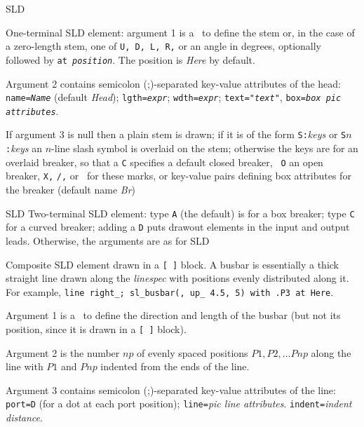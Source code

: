 %
  {SLD}%
  {One-terminal SLD element: argument 1 is a \linespec\ to define the stem
   or, in the case of a zero-length stem, one of {\tt U, D, L, R,} or an
   angle in degrees, optionally followed by {\tt at {\sl position}}.
   The position is {\sl Here} by default.

   Argument 2 contains semicolon (;)-separated key-value attributes
   of the head:
   {\tt name={\sl{}Name}} (default {\sl Head});
   {\tt lgth={\sl{}expr}};
   {\tt wdth={\sl{}expr}};
   {\tt text="{\sl{}text}"},
   {\tt box={\sl{}box pic attributes}}.

   If argument 3 is null then a plain stem is drawn; if it is of the
   form {\tt S:}{\sl keys} or {\tt S$n$:}{\sl keys} an $n$-line slash
   symbol is overlaid on the stem; otherwise the keys are for an overlaid
   breaker, so that a {\tt C} specifies a default closed breaker, {\tt
   O} an open breaker, {\tt X,} {\tt /,} or \bsl\ for these marks, or
    key-value pairs defining box attributes
   for the breaker (default name {\sl Br})

   }%
%
  {SLD}%
  {Two-terminal SLD element:
   type {\tt A} (the default) is for a box breaker; type 
   {\tt C} for a curved breaker; adding a {\tt D} puts drawout elements
   in the input and output leads.
   Otherwise, the arguments are as for 
   }%
%
  {SLD}%
  {Composite SLD element drawn in a {\tt [ ]} block.  A busbar is
   essentially a thick straight line 
   drawn along the {\sl linespec} with positions evenly distributed
   along it.  For example,
     {\tt line right\_; sl\_busbar(, up\_ 4.5, 5) with .P3 at Here}.

   Argument 1 is a \linespec\ to define the direction and length of the
     busbar (but not its position, since it is drawn in a {\tt [ ]} block).

   Argument 2 is the number $np$ of evenly spaced positions
     $P1, P2, \ldots Pnp$ along the line with $P1$ and $Pnp$ indented
     from the ends of the line.

   Argument 3 contains semicolon (;)-separated key-value attributes
     of the line:
   {\tt port=D} (for a dot at each port position);
   {\tt line=}{\sl pic line attributes}.
   {\tt indent=}{\sl indent distance}.
   }%
